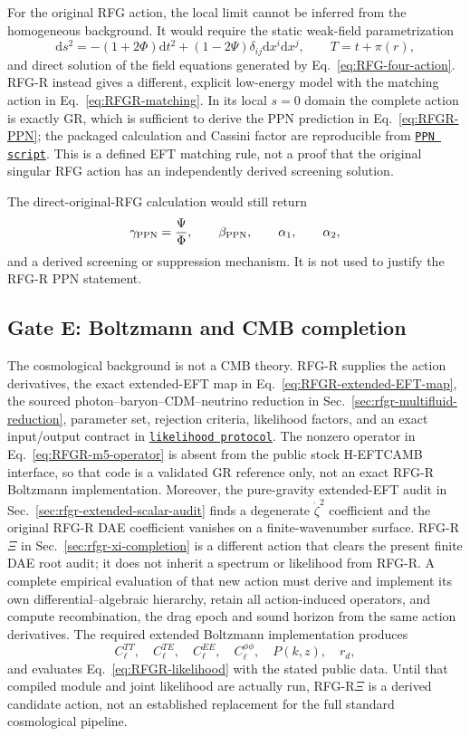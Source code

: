 \documentclass[11pt,a4paper]{article}
\renewcommand{\dd}{\mathrm{d}}
\newcommand{\RFGRepoURL}{https://github.com/MartinPetrasek123/MartinPetrasek123}
\newcommand{\RFGRepoNamed}[2]{\href{\RFGRepoURL/blob/main/r-universe-complete-chain/rfg-r-completion/r\_universe\_completion/#1}{\texttt{#2}}}
\begin{document}
For the original RFG action, the local limit cannot be inferred from the
homogeneous background. It would require the static weak-field parametrization
\[
\dd s^2=-(1+2\Phi)\dd t^2+(1-2\Psi)\delta_{ij}\dd x^i\dd x^j,
\qquad
T=t+\pi(r),
\]
and direct solution of the field equations generated by Eq.~\eqref{eq:RFG-four-action}. RFG-R instead gives a different, explicit low-energy model with the matching action in Eq.~\eqref{eq:RFGR-matching}. In its local \(s=0\) domain the complete action is exactly GR, which is sufficient to derive the PPN prediction in Eq.~\eqref{eq:RFGR-PPN}; the packaged calculation and Cassini factor are reproducible from \RFGRepoNamed{scripts/ppn\_likelihood.py}{PPN script}. This is a defined EFT matching rule, not a proof that the original singular RFG action has an independently derived screening solution.

The direct-original-RFG calculation would still return
\[
\gamma_{\rm PPN}=\frac{\Psi}{\Phi},\qquad
\beta_{\rm PPN},\qquad
\alpha_1,\qquad
\alpha_2,
\]
and a derived screening or suppression mechanism. It is not used to justify the RFG-R PPN statement.

\subsection{Gate E: Boltzmann and CMB completion}

The cosmological background is not a CMB theory. RFG-R supplies the action derivatives, the exact extended-EFT map in Eq.~\eqref{eq:RFGR-extended-EFT-map}, the sourced photon--baryon--CDM--neutrino reduction in Sec.~\ref{sec:rfgr-multifluid-reduction}, parameter set, rejection criteria, likelihood factors, and an exact input/output contract in \RFGRepoNamed{docs/likelihood\_pipeline.md}{likelihood protocol}.  The nonzero operator in Eq.~\eqref{eq:RFGR-m5-operator} is absent from the public stock H-EFTCAMB interface, so that code is a validated GR reference only, not an exact RFG-R Boltzmann implementation. Moreover, the pure-gravity extended-EFT audit in Sec.~\ref{sec:rfgr-extended-scalar-audit} finds a degenerate \(\dot\zeta^2\) coefficient and the original RFG-R DAE coefficient vanishes on a finite-wavenumber surface. RFG-R\(\Xi\) in Sec.~\ref{sec:rfgr-xi-completion} is a different action that clears the present finite DAE root audit; it does not inherit a spectrum or likelihood from RFG-R. A complete empirical evaluation of that new action must derive and implement its own differential--algebraic hierarchy, retain all action-induced operators, and compute recombination, the drag epoch and sound horizon from the same action derivatives. The required extended Boltzmann implementation produces
\[
C_\ell^{TT},\quad C_\ell^{TE},\quad C_\ell^{EE},\quad
C_\ell^{\phi\phi},\quad P(k,z),\quad r_d,
\]
and evaluates Eq.~\eqref{eq:RFGR-likelihood} with the stated public data. Until that compiled module and joint likelihood are actually run, RFG-R\(\Xi\) is a derived candidate action, not an established replacement for the full standard cosmological pipeline.
\end{document}
